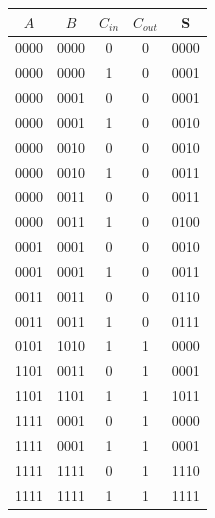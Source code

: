 \documentclass[12pt]{article}
\begin{document}
\begin{center}
\begin{tabular}{ccc|cc}
$A$ & $B$ & $C_{in}$ & $C_{out}$ & S \\
\hline
0000 & 0000 & 0 & 0 & 0000 \\
0000 & 0000 & 1 & 0 & 0001 \\
0000 & 0001 & 0 & 0 & 0001 \\
0000 & 0001 & 1 & 0 & 0010 \\
0000 & 0010 & 0 & 0 & 0010 \\
0000 & 0010 & 1 & 0 & 0011 \\
0000 & 0011 & 0 & 0 & 0011 \\
0000 & 0011 & 1 & 0 & 0100 \\
0001 & 0001 & 0 & 0 & 0010 \\
0001 & 0001 & 1 & 0 & 0011 \\
0011 & 0011 & 0 & 0 & 0110 \\
0011 & 0011 & 1 & 0 & 0111 \\
0101 & 1010 & 1 & 1 & 0000 \\
1101 & 0011 & 0 & 1 & 0001 \\
1101 & 1101 & 1 & 1 & 1011 \\
1111 & 0001 & 0 & 1 & 0000 \\
1111 & 0001 & 1 & 1 & 0001 \\
1111 & 1111 & 0 & 1 & 1110 \\
1111 & 1111 & 1 & 1 & 1111 \\
\hline
\end{tabular}
\end{center}
\end{document}
